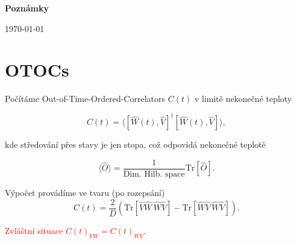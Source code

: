 \documentclass{article}
\begin{document}
\begin{center}
    \Large
    \textbf{Poznámky}
           
    \vspace{0.4cm}
    \small
    \today
\end{center}

\section{OTOCs}
Počítáme Out-of-Time-Ordered-Correlators $C(t)$ v limitě nekonečné teploty

$$C(t) = \langle[\hat{W}(t),\hat{V}]^{\dagger}[\hat{W}(t),\hat{V}]\rangle, $$

kde středování přes stavy je jen stopa, což odpovídá nekonečné teplotě

$$\langle \hat{O} \rangle = \frac{1}{\text{Dim. Hilb. space}}\text{Tr}[\hat{O}].$$

Výpočet provádíme ve tvaru (po rozepsání)
$$C(t) = \frac{2}{D}(\text{Tr}[\hat{V} \hat{W}\, \hat{W} \hat{V} ] - \text{Tr}[\hat{W} \hat{V} \, \hat{W} \hat{V}]).$$

\textcolor{red}{Zvláštní situace $C(t)_{VW} = C(t)_{WV}$.}
\end{document}
